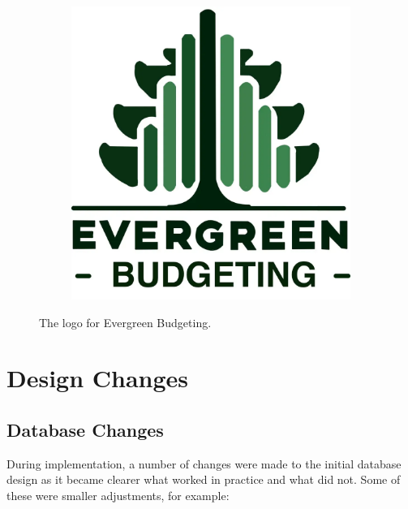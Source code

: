 \documentclass{l4proj}
\begin{document}
\begin{figure}[htb] 
    \centering
    \begin{subfigure}[b]{0.25\textwidth}
        \includegraphics[width=\textwidth]{images/Logo/logo.png}
    \end{subfigure}   
    \caption{The logo for Evergreen Budgeting.}\label{fig:logo}
\end{figure}

\section{Design Changes}
\subsection{Database Changes}
During implementation, a number of changes were made to the initial database design as it became clearer what worked in practice and what did not. Some of these were smaller adjustments, for example:
\end{document}
